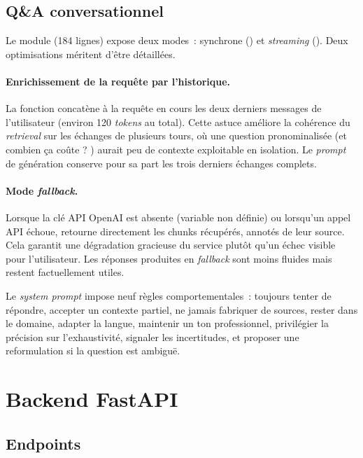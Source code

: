 \subsection{Q\&A conversationnel}

Le module  (184 lignes) expose deux modes~: synchrone () et \textit{streaming} (). Deux optimisations méritent d'être détaillées.

\paragraph{Enrichissement de la requête par l'historique.} La fonction  concatène à la requête en cours les deux derniers messages de l'utilisateur (environ 120 \textit{tokens} au total). Cette astuce améliore la cohérence du \textit{retrieval} sur les échanges de plusieurs tours, où une question pronominalisée (\og et combien ça coûte ? \fg) aurait peu de contexte exploitable en isolation. Le \textit{prompt} de génération conserve pour sa part les trois derniers échanges complets.

\paragraph{Mode \textit{fallback}.} Lorsque la clé \ac{API} OpenAI est absente (variable  non définie) ou lorsqu'un appel \ac{API} échoue,  retourne directement les chunks récupérés, annotés de leur source. Cela garantit une dégradation gracieuse du service plutôt qu'un échec visible pour l'utilisateur. Les réponses produites en \textit{fallback} sont moins fluides mais restent factuellement utiles.

Le \textit{system prompt} impose neuf règles comportementales~: toujours tenter de répondre, accepter un contexte partiel, ne jamais fabriquer de sources, rester dans le domaine, adapter la langue, maintenir un ton professionnel, privilégier la précision sur l'exhaustivité, signaler les incertitudes, et proposer une reformulation si la question est ambiguë.

\section{Backend FastAPI}

\subsection{Endpoints}


